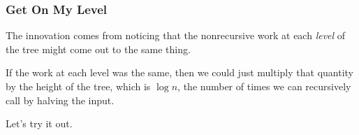 \documentclass[aspectratio=169]{beamer}
\begin{document}
\begin{frame}[fragile]
  \frametitle{Get On My Level}

  The innovation comes from noticing that the nonrecursive work
  at each \textit{level} of the tree might come out to the same thing.

  \pause
  \vspace{\fill}

  If the work at each level was the same, then we could just multiply
  that quantity by the height of the tree, which is $\log n$, the number
  of times we can recursively call  by halving the input.

  \pause
  \vspace{\fill}

  Let's try it out.
\end{frame}
\end{document}

